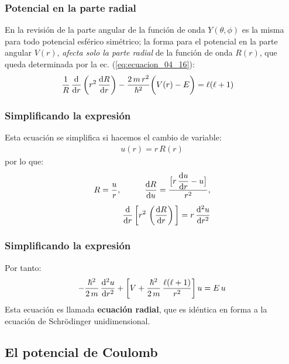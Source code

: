 \documentclass[12pt]{beamer}
\begin{document}
\begin{frame}
\frametitle{Potencial en la parte radial}
En la revisión de la parte angular de la función de onda $Y(\theta, \phi)$ es la misma para todo potencial esférico simétrico; la forma para el potencial en la parte angular $V(r)$, \emph{afecta solo la parte radial} de la función de onda $R(r)$, que queda determinada por la ec. (\ref{eq:ecuacion_04_16}):
\pause
\begin{align*}
    \dfrac{1}{R} \, \dv{r} \left( r^{2} \, \dv{R}{r} \right) - \dfrac{2 \, m \, r^{2}}{\hbar^{2}} \bigg( V(r) - E \bigg) &= \ell (\ell + 1)
\end{align*}
\end{frame}
\begin{frame}
\frametitle{Simplificando la expresión}
Esta ecuación se simplifica si hacemos el cambio de variable:
\pause
\begin{align}
    u(r) = r \, R(r)
    \label{eq:ecuacion_04_36}
\end{align}
\pause
por lo que:
\begin{align*}
R = \dfrac{u}{r}, \hspace{1cm} \dv{R}{u} = \dfrac{ \big[ r \, \displaystyle \dv{u}{r} - u \big]}{r^{2}}, \\[0.5em]
\dv{r} \, \bigg[ r^{2} \, \left( \dv{R}{r} \right) \bigg] = r \, \dv[2]{u}{r}
\end{align*}
\end{frame}
\begin{frame}
\frametitle{Simplificando la expresión}
Por tanto:
\begin{align}
    - \dfrac{\hbar^{2}}{2 \, m} \, \dv[2]{u}{r} + \bigg[ V + \dfrac{\hbar^{2}}{2 \, m} \,\dfrac{\ell (\ell + 1)}{r^{2}} \bigg] \, u =  E \, u
    \label{eq:ecuacion_04_37}
\end{align}
\pause
Esta ecuación es llamada \textbf{ecuación radial}, que es idéntica en forma a la ecuación de Schrödinger unidimensional.
\end{frame}

\subsection{El potencial de Coulomb}
\end{document}
